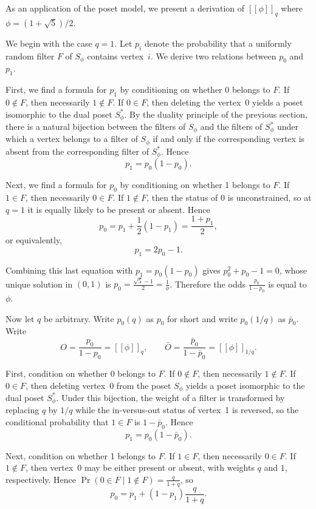 \documentclass[12pt]{article}
\theoremstyle{plain}
\theoremstyle{definition}
\theoremstyle{remark}
\newcommand{\llb}{[\![}
\newcommand{\rrb}{]\!]}
\begin{document}
As an application of the poset model,
we present a derivation of $\llb \phi \rrb_q$
where $\phi = (1+\sqrt{5})/2$.

We begin with the case $q=1$.
Let $p_i$ denote the probability that
a uniformly random filter $F$ of $S_\phi$ contains vertex~$i$.
We derive two relations between $p_0$ and $p_1$.

First, we find a formula for $p_1$ 
by conditioning on whether 0 belongs to $F$.
If $0 \notin F$, then necessarily $1 \notin F$.
If $0 \in F$, then deleting the vertex~0 yields 
a poset isomorphic to the dual poset $S_\phi^*$.
By the duality principle of the previous section,
there is a natural bijection between the filters of $S_\phi$
and the filters of $S_\phi^*$
under which a vertex belongs to a filter of $S_\phi$
if and only if the corresponding vertex is absent from
the corresponding filter of $S_\phi^*$.
Hence \[ p_1 = p_0(1-p_0).  \]

Next, we find a formula for $p_0$
by conditioning on whether 1 belongs to $F$.
If $1 \in F$, then necessarily $0 \in F$.
If $1 \notin F$, then the status of $0$ is unconstrained,
so at $q=1$ it is equally likely to be present or absent.
Hence \[ p_0 = p_1 + \frac12(1-p_1) = \frac{1+p_1}{2}, \]
or equivalently, \[ p_1 = 2p_0-1.  \]

Combining this last equation with $p_1=p_0(1-p_0)$ gives
$p_0^2+p_0-1=0$,
whose unique solution in $(0,1)$ is $p_0=\frac{\sqrt5-1}{2}=\frac1\phi$.
Therefore the odds $\frac{p_0}{1-p_0}$ is equal to $\phi$.

Now let $q$ be arbitrary.
Write $p_0(q)$ as $p_0$ for short
and write $p_0(1/q)$ as $\bar p_0$.
Write
\[ O=\frac{p_0}{1-p_0}=\llb\phi\rrb_q, \qquad
\bar O=\frac{\bar p_0}{1-\bar p_0} =\llb\phi\rrb_{1/q}.  \]

First, condition on whether 0 belongs to $F$.
If $0 \notin F$, then necessarily $1 \notin F$.
If $0 \in F$, then deleting vertex~0 from the poset $S_\phi$
yields a poset isomorphic to the dual poset $S_\phi^*$.
Under this bijection, the weight of a filter is transformed 
by replacing $q$ by $1/q$ while the in-versus-out status
of vertex~1 is reversed, so the conditional probability that $1 \in F$
is $1-\bar p_0$. Hence \[ p_1=p_0(1-\bar p_0).  \]

Next, condition on whether 1 belongs to $F$.
If $1 \in F$, then necessarily $0 \in F$.
If $1 \notin F$, then vertex~0 may be either present or absent,
with weights $q$ and $1$, respectively.
Hence $\Pr(0\in F\mid 1\notin F)=\frac{q}{1+q}$,
so \[ p_0 = p_1 + (1-p_1)\frac{q}{1+q}.  \]
\end{document}
